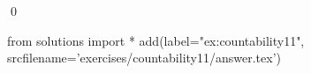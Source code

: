 
\begin{ex} 
  \label{ex:countability11}
  
  \qed
\end{ex} 
\begin{python0}
from solutions import *
add(label="ex:countability11",
    srcfilename='exercises/countability11/answer.tex') 
\end{python0}
